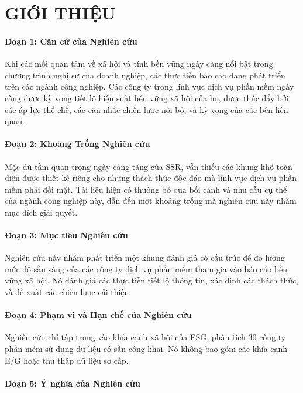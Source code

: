 \chapter{GIỚI THIỆU}

\subsubsection{Đoạn 1: Căn cứ của Nghiên cứu}

Khi các mối quan tâm về xã hội và tính bền vững ngày càng nổi bật trong chương trình nghị sự của doanh nghiệp, 
các thực tiễn báo cáo đang phát triển trên các ngành công nghiệp. Các công ty trong lĩnh vực dịch vụ phần mềm ngày càng được kỳ vọng 
tiết lộ hiệu suất bền vững xã hội của họ, 
được thúc đẩy bởi các áp lực thể chế, các cân nhắc chiến lược nội bộ, 
và kỳ vọng của các bên liên quan.

\subsubsection{Đoạn 2: Khoảng Trống Nghiên cứu}

Mặc dù tầm quan trọng ngày càng tăng của SSR, vẫn thiếu các khung khổ toàn diện 
được thiết kế riêng cho những thách thức độc đáo mà lĩnh vực dịch vụ phần mềm phải đối mặt. 
Tài liệu hiện có thường bỏ qua bối cảnh và nhu cầu cụ thể của ngành công nghiệp này, 
dẫn đến một khoảng trống mà nghiên cứu này nhằm mục đích giải quyết.

\subsubsection{Đoạn 3: Mục tiêu Nghiên cứu}

Nghiên cứu này nhằm phát triển một khung đánh giá có cấu trúc để đo lường 
mức độ sẵn sàng của các công ty dịch vụ phần mềm tham gia 
vào báo cáo bền vững xã hội. Nó đánh giá các thực tiễn tiết lộ thông tin, 
xác định các thách thức, và đề xuất các chiến lược cải thiện.

\subsubsection{Đoạn 4: Phạm vi và Hạn chế của Nghiên cứu}
Nghiên cứu chỉ tập trung vào khía cạnh xã hội của ESG, phân tích 30 
công ty phần mềm sử dụng dữ liệu có sẵn công khai. 
Nó không bao gồm các khía cạnh E/G hoặc thu thập dữ liệu sơ cấp.

\subsubsection{Đoạn 5: Ý nghĩa của Nghiên cứu}

